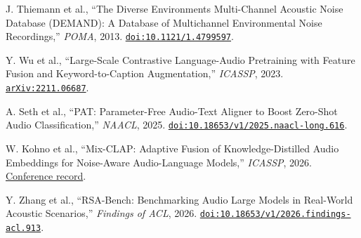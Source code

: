 \documentclass[a4paper,11pt]{article}
\begin{document}
\begin{enumerate}[label={[\arabic*]},widest=12,leftmargin=*,labelsep=0.5em,align=left,itemsep=0.6em,parsep=0pt,topsep=0pt]
\item\label{ref:8} J. Thiemann et al., ``The Diverse Environments Multi-Channel Acoustic Noise Database (DEMAND): A Database of Multichannel Environmental Noise Recordings,'' \emph{POMA}, 2013. \href{https://doi.org/10.1121/1.4799597}{\nolinkurl{doi:10.1121/1.4799597}}.

\item\label{ref:9} Y. Wu et al., ``Large-Scale Contrastive Language-Audio Pretraining with Feature Fusion and Keyword-to-Caption Augmentation,'' \emph{ICASSP}, 2023. \href{https://arxiv.org/abs/2211.06687}{\nolinkurl{arXiv:2211.06687}}.

\item\label{ref:10} A. Seth et al., ``PAT: Parameter-Free Audio-Text Aligner to Boost Zero-Shot Audio Classification,'' \emph{NAACL}, 2025. \href{https://aclanthology.org/2025.naacl-long.616/}{\nolinkurl{doi:10.18653/v1/2025.naacl-long.616}}.

\item\label{ref:11} W. Kohno et al., ``Mix-CLAP: Adaptive Fusion of Knowledge-Distilled Audio Embeddings for Noise-Aware Audio-Language Models,'' \emph{ICASSP}, 2026. \href{https://www.cmsworkshops.com/ICASSP2026/view_paper.php?PaperNum=4206}{Conference record}.

\item\label{ref:12} Y. Zhang et al., ``RSA-Bench: Benchmarking Audio Large Models in Real-World Acoustic Scenarios,'' \emph{Findings of ACL}, 2026. \href{https://aclanthology.org/2026.findings-acl.913/}{\nolinkurl{doi:10.18653/v1/2026.findings-acl.913}}.

\end{enumerate}
\endgroup
\end{document}
